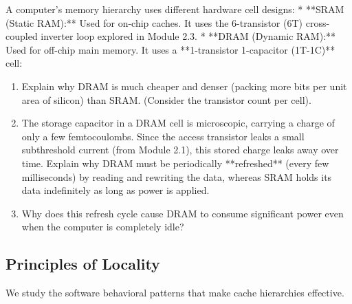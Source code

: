 \documentclass[12pt, a4paper]{book}
\begin{document}
\begin{explobox}
A computer's memory hierarchy uses different hardware cell designs:
* **SRAM (Static RAM):** Used for on-chip caches. It uses the 6-transistor (6T) cross-coupled inverter loop explored in Module 2.3.
* **DRAM (Dynamic RAM):** Used for off-chip main memory. It uses a **1-transistor 1-capacitor (1T-1C)** cell:
\begin{center}
\end{center}
\begin{enumerate}[label=(\alph*), leftmargin=*]
  \item Explain why DRAM is much cheaper and denser (packing more bits per unit area of silicon) than SRAM. (Consider the transistor count per cell).
  \item The storage capacitor in a DRAM cell is microscopic, carrying a charge of only a few femtocoulombs.
        Since the access transistor leaks a small subthreshold current (from Module 2.1), this stored charge leaks away over time.
        Explain why DRAM must be periodically **refreshed** (every few milliseconds) by reading and rewriting the data, whereas SRAM holds its data indefinitely as long as power is applied.
  \item Why does this refresh cycle cause DRAM to consume significant power even when the computer is completely idle?
\end{enumerate}
\end{explobox}

\subsection{Principles of Locality}

We study the software behavioral patterns that make cache hierarchies effective.
\end{document}
